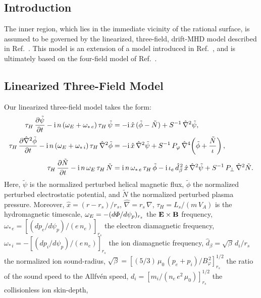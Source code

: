 \documentclass[12pt,prb,aps]{revtex4-1}
\begin{document}
\subsection{Introduction}
The inner region, which lies in the immediate vicinity of the rational surface, is assumed to be governed by the  linearized, three-field, drift-MHD model described in Ref.~. This
model is an extension of a model introduced in Ref.~, and is ultimately based on the four-field model of Ref.~. 

\subsection{Linearized Three-Field Model}
Our linearized three-field model takes the form:\cite{err2,err3}
\begin{align}\label{e64}
\tau_H\,\frac{\partial\tilde{\psi}}{\partial t}-{\rm i}\,n\,(\omega_E +\omega_{\ast\,e})\,\tau_H\,\tilde{\psi} &= -{\rm i} \,\hat{x}\,(\tilde{\phi}-\tilde{N})+ S^{-1}\,\hat{\nabla}^2\tilde{\psi},\\[0.5ex]
\tau_H\,\frac{\partial\hat{\nabla}^2\tilde{\phi}}{\partial t}-{\rm i}\,n\,(\omega_E+\omega_{\ast\,i})\,\tau_H\,\hat{\nabla}^2\tilde{\phi} &= -{\rm i}\,\hat{x}\,\hat{\nabla}^2\tilde{\psi}+S^{-1}\,P_\varphi\,\hat{\nabla}^4\!\left(\tilde{\phi} + \frac{\tilde{N}}{\iota}\right),\\[0.5ex]
\tau_H\,\frac{\partial\tilde{N}}{\partial t}-{\rm i}\,n\,\omega_E\,\tau_H\,\tilde{N} &={\rm i}\,n\,\omega_{\ast\,e}\,\tau_H\,\tilde{\phi} - {\rm i}\,\iota_e\,\hat{d}_\beta^{\,2}\,\hat{x}\,\hat{\nabla}^2\tilde{\psi}+ S^{-1}\,P_\perp\,\hat{\nabla}^2 \tilde{N}.\label{e66}
\end{align}
Here, $\tilde{\psi}$ is the normalized perturbed helical magnetic flux, $\tilde{\phi}$  the normalized perturbed electrostatic potential, and $\tilde{N}$ 
the normalized perturbed plasma pressure. Moreover, $\hat{x}=(r-r_s)/r_s$, $\hat{\nabla}= r_s\,\nabla$, $\tau_H=L_s/(m\,V_A)$ is
the hydromagnetic timescale, $\omega_E=-(d{\mit\Phi}/d\psi_p)_{r_s}$ the ${\bf E}\times {\bf B}$ frequency, $\omega_{\ast\,e}=[(dp_e/d\psi_p)/(e\,n_e)]_{r_s}$
the electron diamagnetic frequency, $\omega_{\ast\,i} = - [(dp_i/d\psi_p)/(e\,n_e)]_{r_s}$ the ion diamagnetic frequency, 
$\hat{d}_\beta =\sqrt{\beta}\,d_i/r_s$ the normalized ion sound-radius, $\sqrt{\beta}=[(5/3)\,\mu_0\,(p_e+p_i)/B_\varphi^{\,2}]_{r_s}^{1/2}$ the ratio of the sound speed to the
Allfv\'{e}n speed, 
$d_i= [m_i/(n_e\,e^2\,\mu_0)]^{1/2}_{r_s}$ the collisionless ion skin-depth, 
\end{document}
